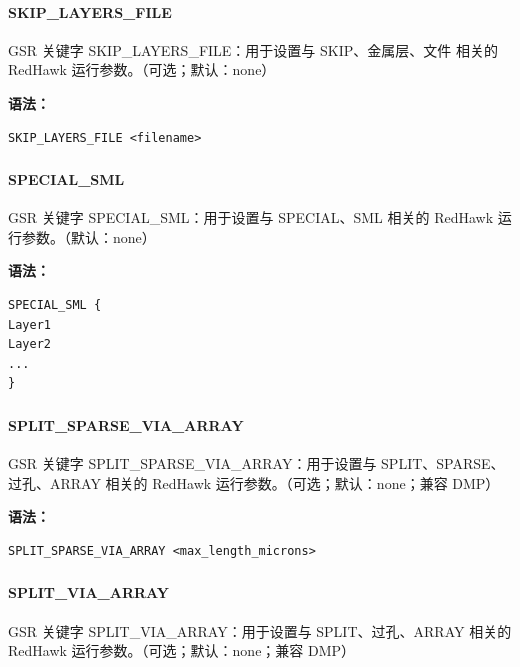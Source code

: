 \paragraph*{SKIP_LAYERS_FILE}

GSR 关键字 SKIP_LAYERS_FILE：用于设置与 SKIP、金属层、文件 相关的 RedHawk 运行参数。（可选；默认：none）

\textbf{语法：}
\begin{lstlisting}
SKIP_LAYERS_FILE <filename>
\end{lstlisting}

\subsubsection{}
\paragraph*{SPECIAL_SML}

GSR 关键字 SPECIAL_SML：用于设置与 SPECIAL、SML 相关的 RedHawk 运行参数。（默认：none）

\textbf{语法：}
\begin{lstlisting}
SPECIAL_SML {
Layer1
Layer2
...
}
\end{lstlisting}

\subsubsection{}
\paragraph*{SPLIT_SPARSE_VIA_ARRAY}

GSR 关键字 SPLIT_SPARSE_VIA_ARRAY：用于设置与 SPLIT、SPARSE、过孔、ARRAY 相关的 RedHawk 运行参数。（可选；默认：none；兼容 DMP）

\textbf{语法：}
\begin{lstlisting}
SPLIT_SPARSE_VIA_ARRAY <max_length_microns>
\end{lstlisting}

\subsubsection{}
\paragraph*{SPLIT_VIA_ARRAY}

GSR 关键字 SPLIT_VIA_ARRAY：用于设置与 SPLIT、过孔、ARRAY 相关的 RedHawk 运行参数。（可选；默认：none；兼容 DMP）

